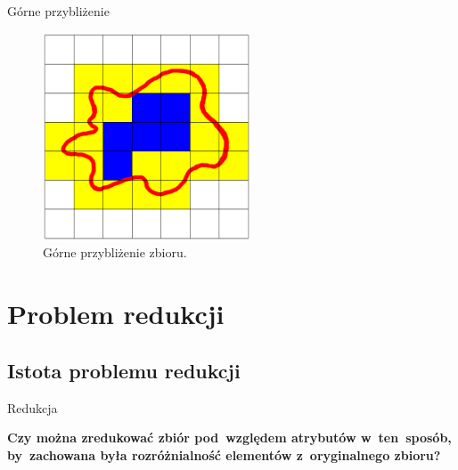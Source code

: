 \documentclass[10pt]{beamer}
\begin{document}
\begin{frame}{Górne przybliżenie}
\begin{center}
\begin{figure}
\includegraphics[width=0.55\textwidth]{Grafiki/gorne_przyblizenie.png}
\caption{Górne przybliżenie zbioru.}
\end{figure}
\end{center}
\end{frame}


\section{Problem redukcji}

\subsection{Istota problemu redukcji}
\begin{frame}{Redukcja}
\begin{spacing}{1.5}
\textbf{Czy można zredukować zbiór pod~względem atrybutów w~ten~sposób, by~zachowana była rozróżnialność elementów z~oryginalnego zbioru?}
\end{spacing}
\end{frame}
\end{document}
